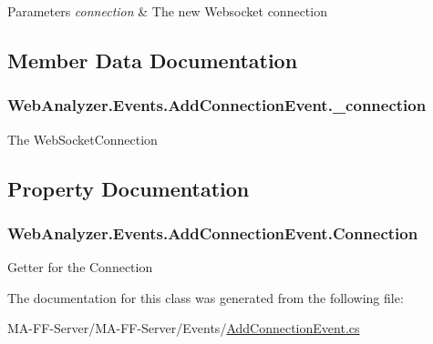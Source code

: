 \begin{DoxyParams}{Parameters}
{\em connection} & The new Websocket connection\\
\hline
\end{DoxyParams}


\subsection{Member Data Documentation}
\hypertarget{class_web_analyzer_1_1_events_1_1_add_connection_event_a986c0c4a2c512fa20048fddca4185a16}{}
\subsubsection[{\+\_\+connection}]{ Web\+Analyzer.\+Events.\+Add\+Connection\+Event.\+\_\+connection\hspace{0.3cm}{\ttfamily [private]}}\label{class_web_analyzer_1_1_events_1_1_add_connection_event_a986c0c4a2c512fa20048fddca4185a16}


The Web\+Socket\+Connection 



\subsection{Property Documentation}
\hypertarget{class_web_analyzer_1_1_events_1_1_add_connection_event_a0ae15899a3e51b1831f5f310436de660}{}
\subsubsection[{Connection}]{ Web\+Analyzer.\+Events.\+Add\+Connection\+Event.\+Connection\hspace{0.3cm}{\ttfamily [get]}}\label{class_web_analyzer_1_1_events_1_1_add_connection_event_a0ae15899a3e51b1831f5f310436de660}


Getter for the Connection 



The documentation for this class was generated from the following file\+:\begin{DoxyCompactItemize}
\item 
M\+A-\/\+F\+F-\/\+Server/\+M\+A-\/\+F\+F-\/\+Server/\+Events/\hyperlink{_add_connection_event_8cs}{Add\+Connection\+Event.\+cs}\end{DoxyCompactItemize}
